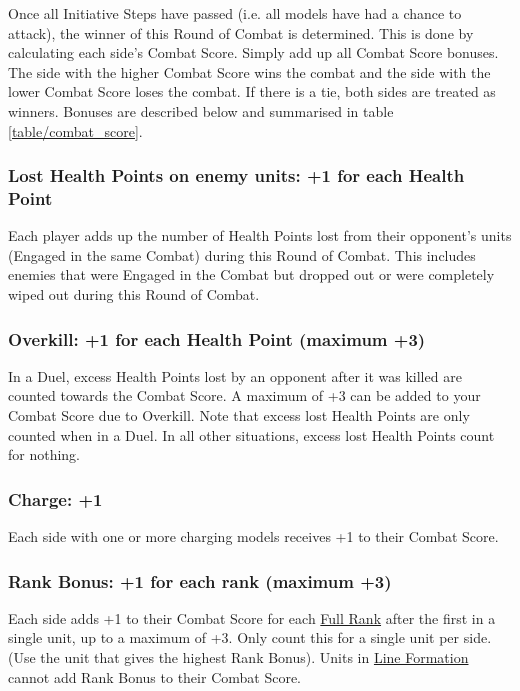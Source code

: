 Once all Initiative Steps have passed (i.e. all models have had a chance to attack), the winner of this Round of Combat is determined. This is done by calculating each side's Combat Score. Simply add up all Combat Score bonuses. The side with the higher Combat Score wins the combat and the side with the lower Combat Score loses the combat. If there is a tie, both sides are treated as winners. Bonuses are described below and summarised in table \ref{table/combat_score}.

\subsubsection{Lost Health Points on enemy units: +1 for each Health Point}

Each player adds up the number of Health Points lost from their opponent's units (Engaged in the same Combat) during this Round of Combat. This includes enemies that were Engaged in the Combat but dropped out or were completely wiped out during this Round of Combat.

\subsubsection{Overkill: +1 for each Health Point (maximum +3)}

In a Duel, excess Health Points lost by an opponent after it was killed are counted towards the Combat Score. A maximum of +3 can be added to your Combat Score due to Overkill. Note that excess lost Health Points are only counted when in a Duel. In all other situations, excess lost Health Points count for nothing.

\subsubsection{Charge: +1}

Each side with one or more charging models receives +1 to their Combat Score.

\subsubsection{Rank Bonus: +1 for each rank (maximum +3)}

Each side adds +1 to their Combat Score for each \hyperref[full_ranks]{Full Rank} after the first in a single unit, up to a maximum of +3. Only count this for a single unit per side. (Use the unit that gives the highest Rank Bonus). Units in \hyperref[line_formation]{Line Formation} cannot add Rank Bonus to their Combat Score.

